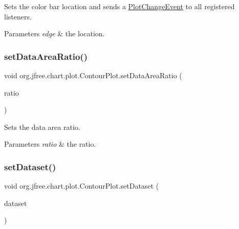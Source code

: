 Sets the color bar location and sends a \mbox{\hyperlink{}{Plot\+Change\+Event}} to all registered listeners.


\begin{DoxyParams}{Parameters}
{\em edge} & the location. \\
\hline
\end{DoxyParams}
\mbox{\label{classorg_1_1jfree_1_1chart_1_1plot_1_1_contour_plot_a690d308fc4aba52538cbfa7d35322c36}} 
\subsubsection{\texorpdfstring{set\+Data\+Area\+Ratio()}{setDataAreaRatio()}}
{\footnotesize\ttfamily void org.\+jfree.\+chart.\+plot.\+Contour\+Plot.\+set\+Data\+Area\+Ratio (\begin{DoxyParamCaption}\item[{double}]{ratio }\end{DoxyParamCaption})}

Sets the data area ratio.


\begin{DoxyParams}{Parameters}
{\em ratio} & the ratio. \\
\hline
\end{DoxyParams}
\mbox{\label{classorg_1_1jfree_1_1chart_1_1plot_1_1_contour_plot_abb2e7d56f57a35a916cefc26785bd466}} 
\subsubsection{\texorpdfstring{set\+Dataset()}{setDataset()}}
{\footnotesize\ttfamily void org.\+jfree.\+chart.\+plot.\+Contour\+Plot.\+set\+Dataset (\begin{DoxyParamCaption}\item[{\mbox{\hyperlink{interfaceorg_1_1jfree_1_1data_1_1contour_1_1_contour_dataset}{Contour\+Dataset}}}]{dataset }\end{DoxyParamCaption})}

